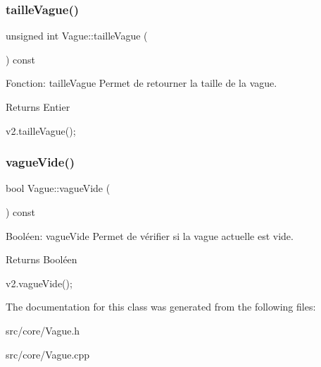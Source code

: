 \subsubsection{\texorpdfstring{taille\+Vague()}{tailleVague()}}
{\footnotesize\ttfamily unsigned int Vague\+::taille\+Vague (\begin{DoxyParamCaption}{ }\end{DoxyParamCaption}) const}



Fonction\+: taille\+Vague Permet de retourner la taille de la vague. 

\begin{DoxyReturn}{Returns}
Entier 
\begin{DoxyCode}
v2.tailleVague();
\end{DoxyCode}
 
\end{DoxyReturn}
\mbox{\label{classVague_aaa31d3deb82c73be899c478a55a6724f}} 
\subsubsection{\texorpdfstring{vague\+Vide()}{vagueVide()}}
{\footnotesize\ttfamily bool Vague\+::vague\+Vide (\begin{DoxyParamCaption}{ }\end{DoxyParamCaption}) const}



Booléen\+: vague\+Vide Permet de vérifier si la vague actuelle est vide. 

\begin{DoxyReturn}{Returns}
Booléen 
\begin{DoxyCode}
v2.vagueVide();
\end{DoxyCode}
 
\end{DoxyReturn}


The documentation for this class was generated from the following files\+:\begin{DoxyCompactItemize}
\item 
src/core/Vague.\+h\item 
src/core/Vague.\+cpp\end{DoxyCompactItemize}
